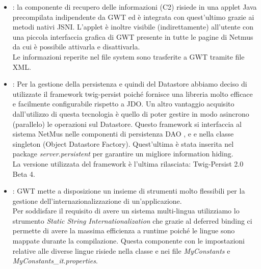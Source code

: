 \begin{itemize}
  \item {} : la componente di recupero delle informazioni (C2) risiede
  in una applet Java precompilata indipendente da GWT ed \`e integrata con
  quest'ultimo grazie ai metodi nativi JSNI. L'applet \`e inoltre visibile
  (indirettamente) all'utente con una piccola interfaccia grafica di GWT
  presente in tutte le pagine di Netmus da cui \`e possibile attivarla e
  disattivarla.\\ Le informazioni reperite nel file system sono trasferite
  a GWT tramite file XML.
  
  \item {} : Per la gestione della persistenza e quindi del
  Datastore abbiamo deciso di utilizzate il framework twig-persist poich\'e
  fornisce una libreria molto efficace e facilmente configurabile
  rispetto a JDO. Un altro vantaggio acquisito dall'utilizzo di questa
  tecnologia \`e quello di poter gestire in modo asincrono (parallelo) le
  operazioni sul Datastore. Questo framework si interfaccia al sistema NetMus
  nelle componenti di persistenza DAO ,  e
   e nella classe singleton  (Object Datastore
  Factory). Quest'ultima è stata inserita nel package \emph{server.persistent}
  per garantire un migliore information hiding. \\
  La versione utilizzata del framework \`e l'ultima rilasciata: Twig-Persist 2.0
  Beta 4.
  
  \item {} : GWT mette a disposizione un insieme di
  strumenti molto flessibili per la gestione dell'internazionalizzazione di
  un'applicazione.\\ Per soddisfare il requisito di avere un sistema
  multi-lingua utilizziamo lo strumento \emph{Static String
  Internationalization} che grazie al deferred binding ci permette di avere la
  massima efficienza a runtime poich\'e le lingue sono mappate durante la
  compilazione. Questa componente con le impostazioni relative alle
  diverse lingue risiede nella classe  e nei file
  \emph{MyConstants} e \emph{MyConstants\_it.properties}.
\end{itemize}

